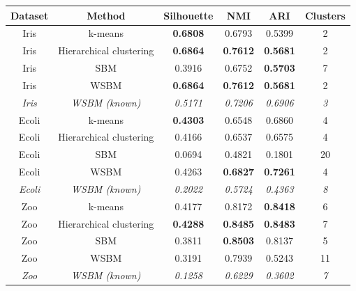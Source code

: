 \documentclass[conference]{IEEEtran}
\begin{document}
\begin{table}[ht]
  \centering
  \begin{tabular}{c | c | c c c | c}
    Dataset & Method & Silhouette & NMI & ARI & Clusters \\ \hline
    Iris & k-means & \textbf{0.6808} & 0.6793 & 0.5399 & 2 \\
    Iris & Hierarchical clustering & \textbf{0.6864} & \textbf{0.7612} & \textbf{0.5681} & 2 \\
    Iris & SBM & 0.3916 & 0.6752 & \textbf{0.5703} & 7 \\
    Iris & WSBM & \textbf{0.6864} & \textbf{0.7612} & \textbf{0.5681} & 2 \\
    \textit{Iris} & \textit{WSBM (known)} & \textit{0.5171} & \textit{0.7206} & \textit{0.6906} & \textit{3} \\
    \hline
    Ecoli & k-means & \textbf{0.4303} & 0.6548 & 0.6860 & 4 \\
    Ecoli & Hierarchical clustering & 0.4166 & 0.6537 & 0.6575 & 4 \\
    Ecoli & SBM & 0.0694 & 0.4821 & 0.1801 & 20 \\
    Ecoli & WSBM & 0.4263 & \textbf{0.6827} & \textbf{0.7261} & 4 \\
    \textit{Ecoli} & \textit{WSBM (known)} & \textit{0.2022} & \textit{0.5724} & \textit{0.4363} & \textit{8} \\
    \hline
    Zoo & k-means & 0.4177 & 0.8172 & \textbf{0.8418} & 6 \\
    Zoo & Hierarchical clustering & \textbf{0.4288} & \textbf{0.8485} & \textbf{0.8483} & 7 \\
    Zoo & SBM & 0.3811 & \textbf{0.8503} & 0.8137 & 5 \\
    Zoo & WSBM & 0.3191 & 0.7939 & 0.5243 & 11 \\
    \textit{Zoo} & \textit{WSBM (known)} & \textit{0.1258} & \textit{0.6229} & \textit{0.3602} & \textit{7} \\
    \hline

\end{tabular}
\end{table}
\end{document}

